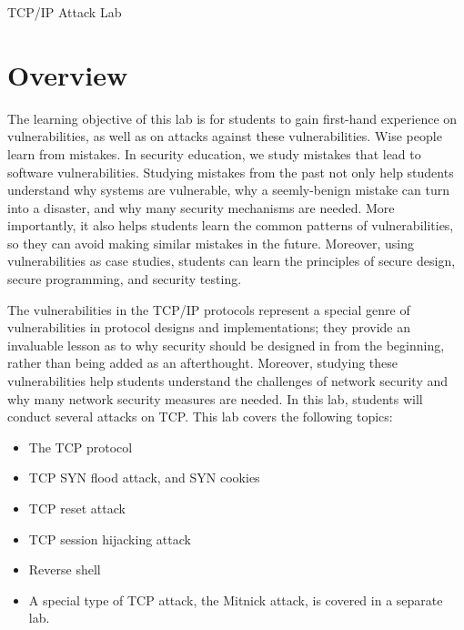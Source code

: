



\newcommand{\telnet} {\texttt{telnet}\xspace}
\newcommand{\tcpFigs}{./Figs}




\setcounter{task}{1}
\newcommand{\mytask} {\bf {\noindent \arabic{task}} \addtocounter{task}{1} \,}



\begin{center}
{\LARGE TCP/IP Attack Lab}
\end{center}




\section{Overview}


The learning objective of this lab is for students to gain first-hand
experience on vulnerabilities, as well as on attacks against these
vulnerabilities. Wise people learn from mistakes. In security education, we
study mistakes that lead to software vulnerabilities. Studying mistakes
from the past not only help students understand why systems are vulnerable,
why a seemly-benign mistake can turn into a disaster, and why many
security mechanisms are needed. More importantly, it also helps students
learn the common patterns of vulnerabilities, so they can avoid making
similar mistakes in the future. Moreover, using vulnerabilities as case
studies, students can learn the principles of secure design, secure
programming, and security testing.

The vulnerabilities in the TCP/IP protocols represent a special genre of
vulnerabilities in protocol designs and implementations; they provide an
invaluable lesson as to why security should be designed in from the
beginning, rather than being added as an afterthought. Moreover, studying
these vulnerabilities help students understand the challenges of network
security and why many network security measures are needed.
In this lab, students will conduct several attacks on TCP.
This lab covers the following topics:

\begin{itemize}[noitemsep]
\item The TCP protocol
\item TCP SYN flood attack, and SYN cookies 
\item TCP reset attack
\item TCP session hijacking attack
\item Reverse shell 
\item A special type of TCP attack, the Mitnick attack, is covered 
in a separate lab. 
\end{itemize}


